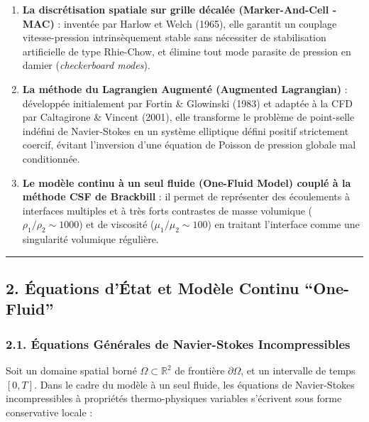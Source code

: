 \documentclass[
  french,
]{article}
\providecommand{\tightlist}{%
  \setlength{\itemsep}{0pt}\setlength{\parskip}{0pt}}
\begin{document}
\begin{enumerate}
\def\labelenumi{\arabic{enumi}.}
\tightlist
\item
  \textbf{La discrétisation spatiale sur grille décalée (Marker-And-Cell
  - MAC)} : inventée par Harlow et Welch (1965), elle garantit un
  couplage vitesse-pression intrinsèquement stable sans nécessiter de
  stabilisation artificielle de type Rhie-Chow, et élimine tout mode
  parasite de pression en damier (\emph{checkerboard modes}).
\item
  \textbf{La méthode du Lagrangien Augmenté (Augmented Lagrangian)} :
  développée initialement par Fortin \& Glowinski (1983) et adaptée à la
  CFD par Caltagirone \& Vincent (2001), elle transforme le problème de
  point-selle indéfini de Navier-Stokes en un système elliptique défini
  positif strictement coercif, évitant l'inversion d'une équation de
  Poisson de pression globale mal conditionnée.
\item
  \textbf{Le modèle continu à un seul fluide (One-Fluid Model) couplé à
  la méthode CSF de Brackbill} : il permet de représenter des
  écoulements à interfaces multiples et à très forts contrastes de masse
  volumique (\(\rho_1 / \rho_2 \sim 1000\)) et de viscosité
  (\(\mu_1 / \mu_2 \sim 100\)) en traitant l'interface comme une
  singularité volumique régulière.
\end{enumerate}

\begin{center}\rule{0.5\linewidth}{0.5pt}\end{center}

\subsection{2. Équations d'État et Modèle Continu
``One-Fluid''}\label{uxe9quations-duxe9tat-et-moduxe8le-continu-one-fluid}

\subsubsection{2.1. Équations Générales de Navier-Stokes
Incompressibles}\label{uxe9quations-guxe9nuxe9rales-de-navier-stokes-incompressibles}

Soit un domaine spatial borné \(\Omega \subset \mathbb{R}^2\) de
frontière \(\partial \Omega\), et un intervalle de temps \([0, T]\).
Dans le cadre du modèle à un seul fluide, les équations de Navier-Stokes
incompressibles à propriétés thermo-physiques variables s'écrivent sous
forme conservative locale :
\end{document}
